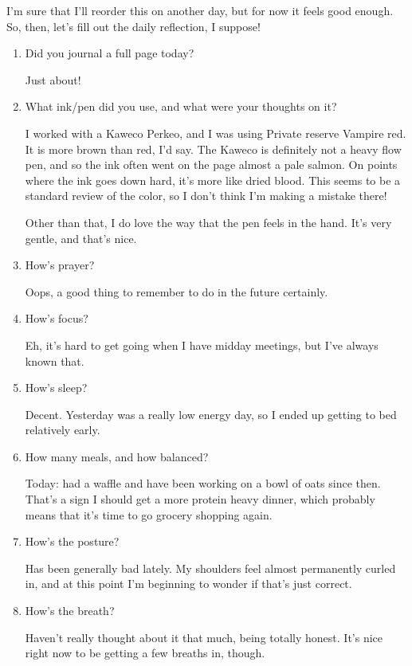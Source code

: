 \documentclass[12pt]{article}
\renewcommand{\,}{\textsuperscript{,}}
\begin{document}
I'm sure that I'll reorder this on another day, but for now it feels good enough. So, then, let's fill out the daily reflection, I suppose!

\begin{enumerate}

\item Did you journal a full page today?

Just about!

\item What ink/pen did you use, and what were your thoughts on it?

I worked with a Kaweco Perkeo, and I was using Private reserve Vampire red. It is more brown than red, I'd say. The Kaweco is definitely not a heavy flow pen, and so the ink often went on the page almost a pale salmon. On points where the ink goes down hard, it's more like dried blood. This seems to be a standard review of the color, so I don't think I'm making a mistake there!

Other than that, I do love the way that the pen feels in the hand. It's very gentle, and that's nice.

\item How's prayer?

Oops, a good thing to remember to do in the future certainly.

\item How's focus?

Eh, it's hard to get going when I have midday meetings, but I've always known that.

\item How's sleep?

Decent. Yesterday was a really low energy day, so I ended up getting to bed relatively early.

\item How many meals, and how balanced?

Today: had a waffle and have been working on a bowl of oats since then. That's a sign I should get a more protein heavy dinner, which probably means that it's time to go grocery shopping again.

\item How's the posture?

Has been generally bad lately. My shoulders feel almost permanently curled in, and at this point I'm beginning to wonder if that's just correct.

\item How's the breath?

Haven't really thought about it that much, being totally honest.  
It's nice right now to be getting a few breaths in, though.


\end{enumerate}
\end{document}
